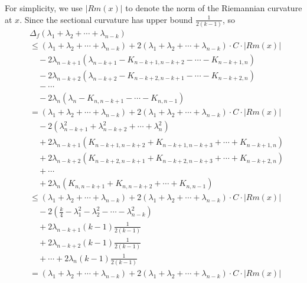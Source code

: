 \documentclass[12pt]{amsart}
\begin{document}
For simplicity, we use $|Rm(x)|$ to denote the norm of the Riemannian curvature at $x$.
Since the sectional curvature has upper bound $\frac{1}{2(k-1)}$, so
\begin{align*}
&\Delta_f \left( \lambda_1 + \lambda_2 + \cdots + \lambda_{n-k} \right)\\
&\leq \left( \lambda_1 + \lambda_2 + \cdots + \lambda_{n-k} \right)+ 2\left( \lambda_1 + \lambda_2 + \cdots + \lambda_{n-k} \right)\cdot C\cdot|Rm(x)|\\
		&\quad -2\lambda_{n-k+1}\left(\lambda_{n-k+1}-K_{n-k+1, n-k+2}-\cdots-K_{n-k+1, n} \right) \\
		&\quad -2\lambda_{n-k+2}\left( \lambda_{n-k+2}-K_{n-k+2, n-k+1}-\cdots-K_{n-k+2, n}\right) \\
		&\quad- \cdots \\
		&\quad -2\lambda_n\left( \lambda_n-K_{n,n-k+1}-\cdots-K_{n, n-1} \right) \\
		&= \left( \lambda_1 + \lambda_2 + \cdots + \lambda_{n-k} \right) + 2\left( \lambda_1 + \lambda_2 + \cdots + \lambda_{n-k} \right)\cdot C\cdot|Rm(x)| \\
		&\quad -2\left( \lambda_{n-k+1}^2 + \lambda_{n-k+2}^2 + \cdots + \lambda_n^2 \right) \\
		&\quad +2\lambda_{n-k+1}\left( K_{n-k+1,n-k+2} + K_{n-k+1,n-k+3} + \cdots + K_{n-k+1,n} \right) \\
		&\quad +2\lambda_{n-k+2}\left( K_{n-k+2,n-k+1} + K_{n-k+2,n-k+3} + \cdots + K_{n-k+2,n} \right) \\
		&\quad +\cdots \\
		&\quad +2\lambda_n\left( K_{n,n-k+1} + K_{n,n-k+2} + \cdots + K_{n,n-1} \right) \\
		&\leq \left( \lambda_1 + \lambda_2 + \cdots + \lambda_{n-k} \right) + 2\left( \lambda_1 + \lambda_2 + \cdots + \lambda_{n-k} \right)\cdot C\cdot|Rm(x)|\\
		&\quad - 2\left( \frac{k}{4} - \lambda_1^2 - \lambda_2^2 - \cdots - \lambda_{n-k}^2 \right) \\
		&\quad +2\lambda_{n-k+1}(k-1)\frac{1}{2(k-1)} \\
		&\quad +2\lambda_{n-k+2}(k-1)\frac{1}{2(k-1)} \\
		&\quad + \cdots + 2\lambda_n(k-1)\frac{1}{2(k-1)} \\
		&= \left( \lambda_1 + \lambda_2 + \cdots + \lambda_{n-k} \right)+ 2\left( \lambda_1 + \lambda_2 + \cdots + \lambda_{n-k} \right)\cdot C\cdot|Rm(x)|\\

\end{align*}
\end{document}
